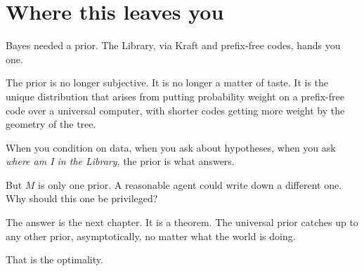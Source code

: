 \section*{Where this leaves you}

Bayes needed a prior. The Library, via Kraft and prefix-free codes, hands you one.

The prior is no longer subjective. It is no longer a matter of taste. It is the unique distribution that arises from putting probability weight on a prefix-free code over a universal computer, with shorter codes getting more weight by the geometry of the tree.

When you condition on data, when you ask about hypotheses, when you ask \emph{where am I in the Library}, the prior is what answers.

But $M$ is only one prior. A reasonable agent could write down a different one. Why should this one be privileged?

The answer is the next chapter. It is a theorem. The universal prior catches up to any other prior, asymptotically, no matter what the world is doing.

That is the optimality.
